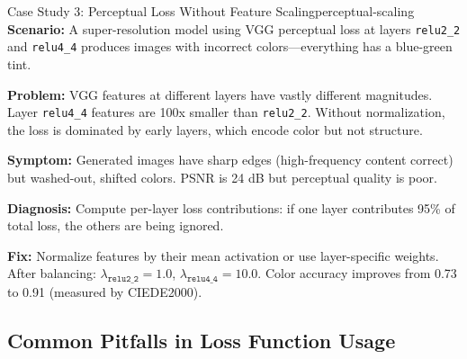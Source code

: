 \documentclass[../../main.tex]{subfiles}
\begin{document}
\begin{example}{Case Study 3: Perceptual Loss Without Feature Scaling}{perceptual-scaling}
\textbf{Scenario:} A super-resolution model using VGG perceptual loss at layers \texttt{relu2\_2} and \texttt{relu4\_4} produces images with incorrect colors---everything has a blue-green tint.

\textbf{Problem:} VGG features at different layers have vastly different magnitudes. Layer \texttt{relu4\_4} features are 100x smaller than \texttt{relu2\_2}. Without normalization, the loss is dominated by early layers, which encode color but not structure.

\textbf{Symptom:} Generated images have sharp edges (high-frequency content correct) but washed-out, shifted colors. PSNR is 24 dB but perceptual quality is poor.

\textbf{Diagnosis:} Compute per-layer loss contributions: if one layer contributes 95\% of total loss, the others are being ignored.

\textbf{Fix:} Normalize features by their mean activation or use layer-specific weights. After balancing: $\lambda_{\texttt{relu2\_2}} = 1.0$, $\lambda_{\texttt{relu4\_4}} = 10.0$. Color accuracy improves from 0.73 to 0.91 (measured by CIEDE2000).
\end{example}

\subsection{Common Pitfalls in Loss Function Usage}
\end{document}
